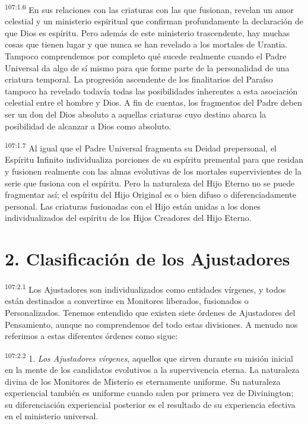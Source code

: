 \par
\textsuperscript{107:1.6} En sus relaciones con las criaturas con las que fusionan, revelan un amor celestial y un ministerio espiritual que confirman profundamente la declaración de que Dios es espíritu. Pero además de este ministerio trascendente, hay muchas cosas que tienen lugar y que nunca se han revelado a los mortales de Urantia. Tampoco comprendemos por completo qué sucede realmente cuando el Padre Universal da algo de sí mismo para que forme parte de la personalidad de una criatura temporal. La progresión ascendente de los finalitarios del Paraíso tampoco ha revelado todavía todas las posibilidades inherentes a esta asociación celestial entre el hombre y Dios. A fin de cuentas, los fragmentos del Padre deben ser un don del Dios absoluto a aquellas criaturas cuyo destino abarca la posibilidad de alcanzar a Dios como absoluto.

\par
\textsuperscript{107:1.7} Al igual que el Padre Universal fragmenta su Deidad prepersonal, el Espíritu Infinito individualiza porciones de su espíritu premental para que residan y fusionen realmente con las almas evolutivas de los mortales supervivientes de la serie que fusiona con el espíritu. Pero la naturaleza del Hijo Eterno no se puede fragmentar así; el espíritu del Hijo Original es o bien difuso o diferenciadamente personal. Las criaturas fusionadas con el Hijo están unidas a los dones individualizados del espíritu de los Hijos Creadores del Hijo Eterno.

\section*{2. Clasificación de los Ajustadores}
\par
\textsuperscript{107:2.1} Los Ajustadores son individualizados como entidades vírgenes, y todos están destinados a convertirse en Monitores liberados, fusionados o Personalizados. Tenemos entendido que existen siete órdenes de Ajustadores del Pensamiento, aunque no comprendemos del todo estas divisiones. A menudo nos referimos a estas diferentes órdenes como sigue:

\par
\textsuperscript{107:2.2} 1. \textit{Los Ajustadores vírgenes}, aquellos que sirven durante su misión inicial en la mente de los candidatos evolutivos a la supervivencia eterna. La naturaleza divina de los Monitores de Misterio es eternamente uniforme. Su naturaleza experiencial también es uniforme cuando salen por primera vez de Divinington; su diferenciación experiencial posterior es el resultado de su experiencia efectiva en el ministerio universal.

